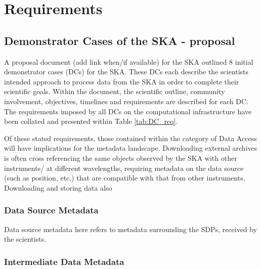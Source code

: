 \section{Requirements}

\subsection{Demonstrator Cases of the SKA - proposal}

A proposal document (add link when/if available) for the SKA outlined 8 initial demonstrator cases (DCs) for the SKA. 
These DCs each describe the scientists intended approach to process data from the SKA in order to complete their scientific goals. 
Within the document, the scientific outline, community involvement, objectives, timelines and requirements are described for each DC.
The requirements imposed by all DCs on the computational infrastructure have been collated and presented within Table \ref{tab:DC_req}. 

\newcommand{\man}[1][]{\(\CIRCLE_{#1}\)}     %
\newcommand{\opt}[1][]{\(\LEFTcircle_{#1}\)} %
\newcommand{\non}{\Circle}                   %



Of these stated requirements, those contained within the category of Data Access will have implications for the metadata landscape.
Downloading external archives is often cross referencing the same objects observed by the SKA with other instruments/ at different wavelengths, requiring metadata on the data source (such as position, etc.) that are compatible with that from other instruments.
Downloading and storing data also 

\subsubsection{Data Source Metadata}

Data source metadata here refers to metadata surrounding the SDPs, received by the scientists. 


\subsubsection{Intermediate Data Metadata}



